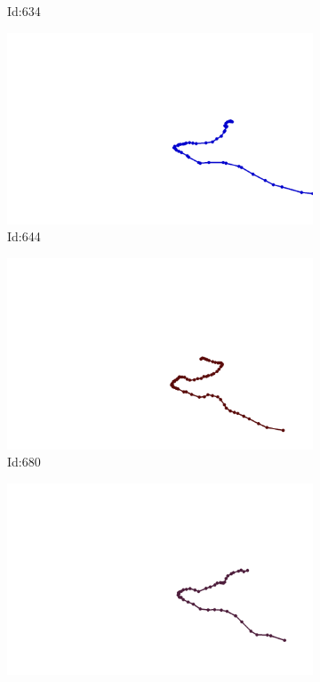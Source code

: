 \documentclass[12pt,twoside]{report}
\begin{document}
\begin{figure}
\begin{subfigure}[b]{0.20\textwidth}
\caption{Id:634}
\end{subfigure}
\begin{subfigure}[b]{0.20\textwidth}
\centering
\includegraphics[width=\textwidth]{../trajectories/644.png}
\caption{Id:644}
\end{subfigure}
\begin{subfigure}[b]{0.20\textwidth}
\centering
\includegraphics[width=\textwidth]{../trajectories/680.png}
\caption{Id:680}
\end{subfigure}
\begin{subfigure}[b]{0.20\textwidth}
\centering
\includegraphics[width=\textwidth]{../trajectories/704.png}

\end{subfigure}
\end{figure}
\end{document}
